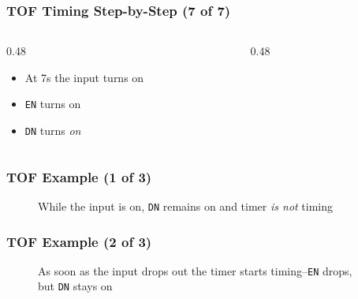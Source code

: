 \begin{frame}
    \frametitle{TOF Timing Step-by-Step (7 of 7)}

    \begin{columns}
        \begin{column}{0.48\linewidth}
            \begin{itemize}
                \item At 7s the input turns on
                \item \texttt{EN} turns on
                \item \texttt{DN} turns \emph{on}
            \end{itemize}
        \end{column}
        \begin{column}{0.48\linewidth}
            \begin{figure}
                \centering
                \resizebox{\columnwidth}{!}{
                    
                }
            \end{figure}  
        \end{column}
    \end{columns}
\end{frame}

\begin{frame}
    \frametitle{TOF Example (1 of 3)}

    \begin{figure}
        \centering
        \resizebox{0.875\linewidth}{!}{
            
        }

        \vspace{0.5em}
        {\footnotesize While the input is on, \texttt{DN} remains on and timer \emph{is not} timing\par}
    \end{figure}
\end{frame}

\begin{frame}
    \frametitle{TOF Example (2 of 3)}

    \begin{figure}
        \centering
        \resizebox{0.875\linewidth}{!}{
            
        }

        \vspace{0.5em}
        {\footnotesize As soon as the input drops out the timer starts timing--\texttt{EN} drops, but \texttt{DN} stays on\par}
    \end{figure}
\end{frame}

